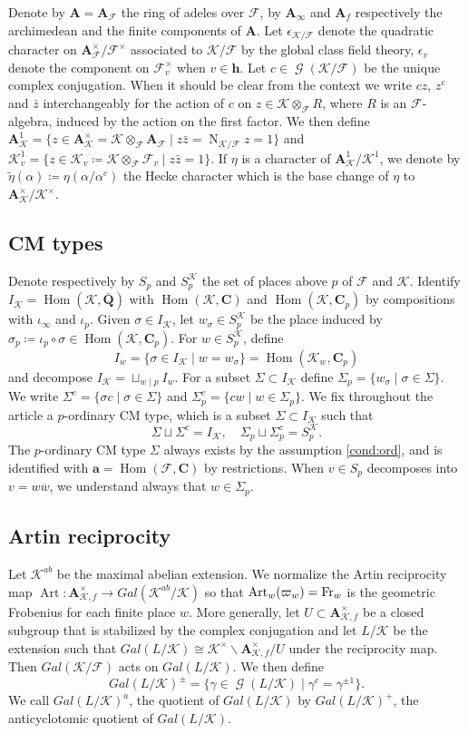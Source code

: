 \documentclass[leqno]{amsart}
\theoremstyle{definition}
\theoremstyle{remark}
\newcommand{\Q}{{\mathbf{Q}}}
\newcommand{\C}{\mathbf C}
\newcommand{\A}{\mathbf A}
\newcommand{\arch}{\mathbf{a}}
\newcommand{\finite}{\mathbf{h}}
\DeclareMathOperator{\Nr}{N}
\DeclareMathOperator{\Hom}{Hom}
\DeclareMathOperator{\Gal}{\mathcal{G}}
\DeclareMathOperator{\Art}{Art}
\newcommand{\Fr}{\textnormal{Fr}} %
\newcommand{\F}{{\mathcal{F}}} %
\newcommand{\K}{{\mathcal{K}}} %
\newcommand{\qch}{\epsilon} %
\newcommand{\bw}{{\overline{w}}}
\begin{document}
Denote by $\A=\A_{\F}$ the ring of adeles over $\F$,
by $\A_{\infty}$ and $\A_{f}$ respectively
the archimedean and the finite components of $\A$.
Let $\qch_{\K/\F}$ denote 
the quadratic character on $\A_\F^\times/\F^\times$
associated to $\K/\F$ by the global class field theory,
$\qch_v$ denote the component on $\F_v^\times$ 
when $v\in \finite$.
Let $c\in \Gal(\K/\F)$ be the unique complex conjugation.
When it should be clear from the context
we write $cz$, $z^c$ and $\bar{z}$ interchangeably 
for the action of $c$ on $z\in \K\otimes_\F R$, where $R$ is an $\F$-algebra,
induced by the action on the first factor.
We then define 
$\A_\K^1=\{z\in \A^\times_\K=\K\otimes_\F \A_\F \mid z\bar{z}=\Nr_{\K/\F}z=1\}$ and
$\K_v^1=\{z\in \K_v\coloneqq \K\otimes_\F\F_v\mid z\bar{z}=1\}$.
If $\eta$ is a character of $\A_\K^1/\K^1$, 
we denote
by $\tilde{\eta}(\alpha)\coloneqq \eta(\alpha/\alpha^c)$
the Hecke character which is the base change of $\eta$ 
to $\A_\K^\times/\K^\times$.

\subsection{CM types}

Denote respectively by $S_p$ and $S_p^\K$ the set of places above $p$
of $\F$ and $\K$.
Identify $I_\K=\Hom(\K,\bar{\Q})$ with
$\Hom(\K,\C)$ and $\Hom(\K,\C_p)$ by compositions with $\iota_\infty$ and $\iota_p$.
Given $\sigma\in I_\K$,
let $w_\sigma\in S_p^\K$ be the place induced by
$\sigma_p\coloneqq \iota_p\circ \sigma\in\Hom(\K,\C_p)$.
For $w\in S_p^\K$, define
\[
    I_w=\{\sigma\in I_\K\mid w=w_\sigma \}=\Hom(\K_w,\C_p)
\]
and decompose $I_\K=\sqcup_{w\mid p}I_w$.
For a subset $\Sigma\subset I_\K$
define $\Sigma_p=\{w_\sigma\mid \sigma\in \Sigma\}$.
We write
$\Sigma^c=\{\sigma c\mid \sigma\in \Sigma\}$ and 
$\Sigma_p^c=\{cw\mid w\in \Sigma_p\}$.
We fix throughout the article a $p$-ordinary CM type,
which is a subset $\Sigma\subset I_\K$ such that
\[
    \Sigma\sqcup \Sigma^c=I_\K,\quad
    \Sigma_p\sqcup \Sigma_p^c=S_p^\K.
\]
The $p$-ordinary CM type $\Sigma$
always exists by the assumption \eqref{cond:ord},
and is identified with $\arch=\Hom(\F,\C)$ by restrictions.
When $v\in S_p$ decomposes into $v=w\bw$,
we understand always that $w\in \Sigma_p$.

\subsection{Artin reciprocity}

Let $\K^{ab}$ be the maximal abelian extension.
We normalize the Artin reciprocity map
$\Art\colon \A_{\K,f}^\times \to Gal(\K^{ab}/\K)$
so that $\Art_w(\varpi_w)=\Fr_w$
is the geometric Frobenius for each finite place $w$.
More generally,
let $U\subset \A_{\K,f}^\times$ be 
a closed subgroup that is stabilized 
by the complex conjugation
and let $L/\K$ be the extension such that 
$Gal(L/\K)\cong \K^\times\backslash \A_{\K,f}^\times/U$
under the reciprocity map.
Then $Gal(\K/\F)$ acts on $Gal(L/\K)$.
We then define 
\[
    Gal(L/\K)^{\pm}=\{\gamma\in \Gal(L/\K)\mid 
    \gamma^c=\gamma^{\pm1}\}.
\]
We call $Gal(L/\K)^a$, the quotient of 
$Gal(L/\K)$ by $Gal(L/\K)^+$,
the anticyclotomic quotient
of $Gal(L/\K)$.
\end{document}
